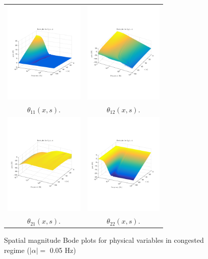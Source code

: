 \documentclass[a4paper, 10pt, conference]{ieeeconf}      %
\begin{document}
\begin{figure}
\centering
\begin{tabular}{cc}
\includegraphics[trim = 0mm 60mm 0mm 60mm, width = 3.8cm]{distr_theta_11}
&
\includegraphics[trim = 0mm 60mm 0mm 60mm, width = 3.8cm]{distr_theta_12}
\tabularnewline
$\theta_{11}(x,s)$.
&
$\theta_{12}(x,s)$.
\tabularnewline
\includegraphics[trim = 0mm 60mm 0mm 60mm, width = 3.8cm]{distr_theta_21}
&
\includegraphics[trim = 0mm 60mm 0mm 60mm, width = 3.8cm]{distr_theta_22}
\tabularnewline
$\theta_{21}(x,s)$.
&
$\theta_{22}(x,s)$.
\tabularnewline
\end{tabular}
\caption{Spatial magnitude Bode plots for physical variables in congested regime ($\left|\alpha\right| = $ 0.05 Hz)\label{fig:Magn_spatial_physx_congested}}
\end{figure}
\end{document}
